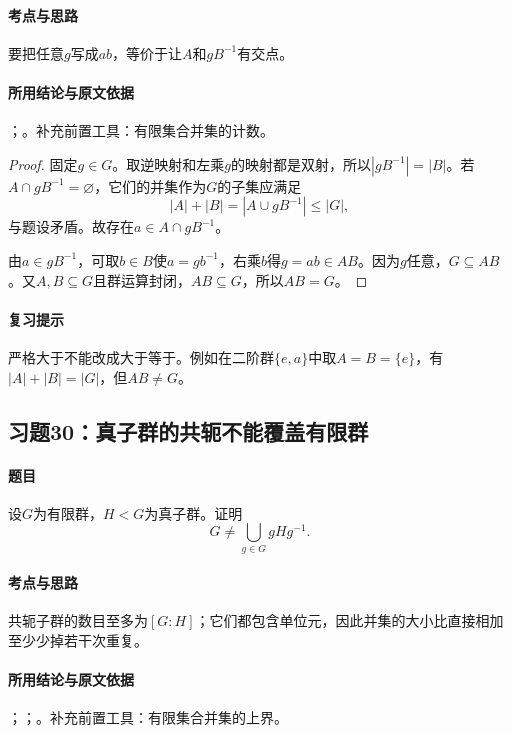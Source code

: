 \paragraph{考点与思路}
要把任意$g$写成$ab$，等价于让$A$和$gB^{-1}$有交点。

\paragraph{所用结论与原文依据}
；。补充前置工具：有限集合并集的计数。


\begin{proof}
固定$g\in G$。取逆映射和左乘$g$的映射都是双射，所以$|gB^{-1}|=|B|$。若$A\cap gB^{-1}=\varnothing$，它们的并集作为$G$的子集应满足
\[
|A|+|B|=|A\cup gB^{-1}|\le|G|,
\]
与题设矛盾。故存在$a\in A\cap gB^{-1}$。

由$a\in gB^{-1}$，可取$b\in B$使$a=gb^{-1}$，右乘$b$得$g=ab\in AB$。因为$g$任意，$G\subseteq AB$。又$A,B\subseteq G$且群运算封闭，$AB\subseteq G$，所以$AB=G$。
\end{proof}

\paragraph{复习提示}
严格大于不能改成大于等于。例如在二阶群$\{e,a\}$中取$A=B=\{e\}$，有$|A|+|B|=|G|$，但$AB\ne G$。


\subsection{习题30：\texorpdfstring{真子群的共轭不能覆盖有限群}{真子群的共轭不能覆盖有限群}}
\label{ex:2:30}

\paragraph{题目}
设$G$为有限群，$H<G$为真子群。证明
\[
G\ne\bigcup_{g\in G}gHg^{-1}.
\]

\paragraph{考点与思路}
共轭子群的数目至多为$[G:H]$；它们都包含单位元，因此并集的大小比直接相加至少少掉若干次重复。

\paragraph{所用结论与原文依据}
；；。补充前置工具：有限集合并集的上界。

